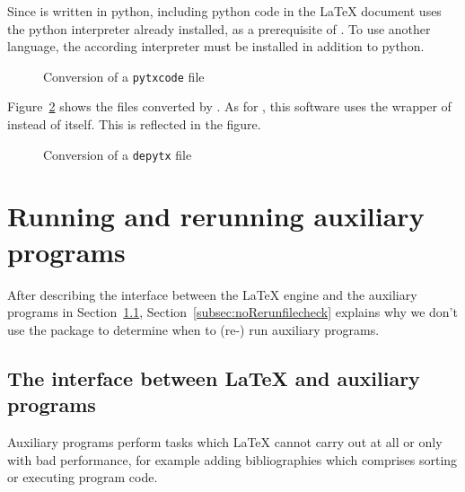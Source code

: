 Since  is written in python, 
including python code in the \LaTeX{} document 
uses the python interpreter already installed, 
as a prerequisite of . 
To use another language, 
the according interpreter must be installed in addition to python. 







\begin{figure}[!htb]
  \centering
  \caption{\label{fig:py2dir}Conversion of a \texttt{pytxcode} file }%
  \end{figure}


  Figure~\ref{fig:depy2out} shows the files converted by . 
  As for , this software uses the wrapper  
  of  instead of  itself. 
  This is reflected in the figure. 


  \begin{figure}[!htb]
    \centering
    \caption{\label{fig:depy2out}Conversion of a \texttt{depytx} file }%
    \end{figure}
  
\section{Running and rerunning auxiliary programs}%
\label{sec:runRerunAux}

After describing the interface 
between the \LaTeX{} engine and the auxiliary programs 
in Section~\ref{subsec:latexAux}, 
Section~\ref{subsec:noRerunfilecheck} explains 
why we don't use the package  
to determine when to (re-) run auxiliary programs. 


\subsection{The interface between \LaTeX{} and auxiliary programs}%
\label{subsec:latexAux}

Auxiliary programs perform tasks which \LaTeX{} cannot carry out at all 
or only with bad performance, 
for example adding bibliographies which comprises sorting 
or executing program code. 

